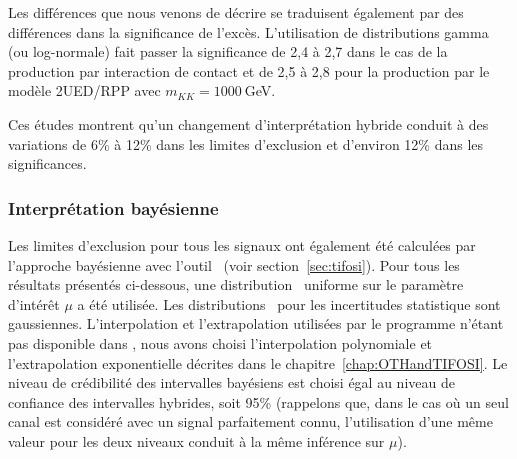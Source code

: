 Les diff\'erences que nous venons de d\'ecrire se traduisent \'egalement par des diff\'erences dans la significance de l'exc\`es. L'utilisation de distributions gamma (ou log-normale) fait passer la significance de 2,4 \`a 2,7 dans le cas de la production par interaction de contact et de 2,5 \`a 2,8 pour la production par le mod\`ele 2UED/RPP avec $m_{KK}=1000~$GeV. 

Ces \'etudes montrent qu'un changement d'interpr\'etation hybride conduit \`a des variations de 6\% \`a 12\% dans les limites d'exclusion et d'environ 12\% dans les significances.

\subsubsection{Interpr\'etation bay\'esienne}
\label{sec:variationInterpretationFourTopBayesian}

Les limites d'exclusion pour tous les signaux ont \'egalement \'et\'e calcul\'ees par l'approche bay\'esienne avec l'outil \tifosi~(voir section~\ref{sec:tifosi}). Pour tous les r\'esultats pr\'esent\'es ci-dessous, une distribution \prior~uniforme sur le param\`etre d'int\'er\^et $\mu$ a \'et\'e utilis\'ee. Les distributions \prior~pour les incertitudes statistique sont gaussiennes. L'interpolation et l'extrapolation utilis\'ees par le programme \mclimit{} n'\'etant pas disponible dans \tifosi, nous avons choisi l'interpolation polynomiale et l'extrapolation exponentielle d\'ecrites dans le chapitre~\ref{chap:OTHandTIFOSI}. Le niveau de cr\'edibilit\'e des intervalles bay\'esiens est choisi \'egal au niveau de confiance des intervalles hybrides, soit 95\% (rappelons que, dans le cas o\`u un seul canal est consid\'er\'e avec un signal parfaitement connu, l'utilisation d'une m\^eme valeur pour les deux niveaux conduit \`a la m\^eme inf\'erence sur $\mu$).


